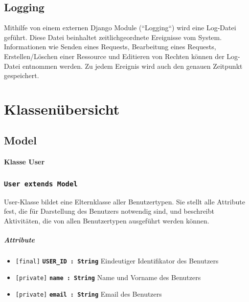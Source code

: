 \documentclass[parskip=full,11pt]{scrartcl}
\newcommand{\class}[1]{\subsubsection*{\lstinline[basicstyle=\ttfamily\large]{#1}}}
\newcommand{\atr}[4]{\lstinline{[#3]} \textbf{\lstinline{#1 : #2}} \newline #4}
\begin{document}
 \subsection{Logging}
Mithilfe von einem externen Django Module (``Logging``) wird eine Log-Datei geführt. Diese Datei beinhaltet zeitlichgeordnete Ereignisse vom System. Informationen wie Senden eines Requests, Bearbeitung eines Requests, Erstellen/Löschen einer Ressource und Editieren von Rechten können der Log-Datei entnommen werden. Zu jedem Ereignis wird auch den genauen Zeitpunkt gespeichert.
 
 
 \newpage
 \section{Klassenübersicht}
 \subsection{Model}
 \paragraph*{Klasse User}
 \class{User extends Model}
User-Klasse bildet eine Elternklasse aller Benutzertypen. Sie stellt alle Attribute fest, die für Darstellung des Benutzers notwendig sind, und beschreibt Aktivitäten, die von allen Benutzertypen ausgeführt werden können.
\subparagraph*{Attribute} %
\begin{itemize}
	\item \atr{USER_ID}{String}{final} {Eindeutiger Identifikator des Benutzers}
	\item \atr{name}{String}{private}{Name und Vorname des Benutzers}	
	\item \atr{email}{String}{private}{Email des Benutzers}
\end{itemize}
\end{document}
